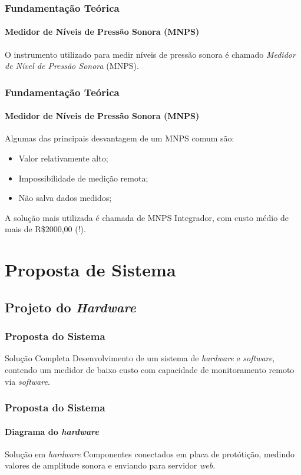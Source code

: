 \documentclass[brazil]{beamer}
\begin{document}
	\begin{frame}
		\frametitle{Fundamentação Teórica}
		\framesubtitle{Medidor de Níveis de Pressão Sonora (MNPS)}
		\vspace{0.4cm}
		\footnotesize{O instrumento utilizado para medir níveis de pressão sonora é chamado \textit{Medidor de Nível de Pressão Sonora} (MNPS). }
	\end{frame}

	\begin{frame}
		\frametitle{Fundamentação Teórica}
		\framesubtitle{Medidor de Níveis de Pressão Sonora (MNPS)}
		Algumas das principais desvantagem de um MNPS comum são:

		\begin{itemize}
			\item Valor relativamente alto;
			\item Impossibilidade de medição remota;
			\item Não salva dados medidos;
		\end{itemize}

		A solução mais utilizada é chamada de MNPS Integrador, com custo médio de mais de R\$2000,00 (!).
	\end{frame}


	\section{Proposta de Sistema}

	\subsection{Projeto do {\it Hardware}}

	\begin{frame}
		\frametitle{Proposta do Sistema}
		\begin{block}{Solução Completa}
			Desenvolvimento de um sistema de {\it hardware} e {\it software}, contendo um medidor de baixo custo com capacidade de monitoramento remoto via \textit{software}.
		\end{block}
	\end{frame}

	\begin{frame}
		\frametitle{Proposta do Sistema}
		\framesubtitle{Diagrama do {\it hardware}}
		\begin{center}
			\begin{block}{\small{Solução em {\it hardware}}}
				\small{Componentes conectados em placa de protótição, medindo valores de amplitude sonora e enviando para servidor {\it web}.}
			\end{block}
		\end{center}
	\end{frame}
\end{document}
